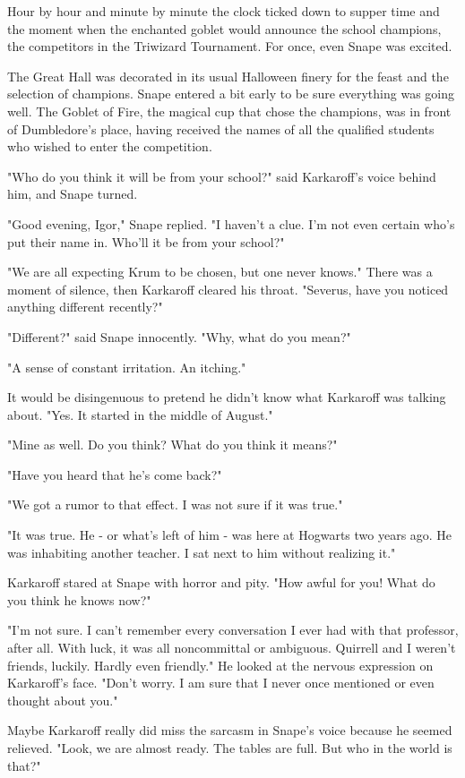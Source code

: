 Hour by hour and minute by minute the clock ticked down to supper time and the moment when the enchanted goblet would announce the school champions, the competitors in the Triwizard Tournament. For once, even Snape was excited.

The Great Hall was decorated in its usual Halloween finery for the feast and the selection of champions. Snape entered a bit early to be sure everything was going well. The Goblet of Fire, the magical cup that chose the champions, was in front of Dumbledore's place, having received the names of all the qualified students who wished to enter the competition.

"Who do you think it will be from your school?" said Karkaroff's voice behind him, and Snape turned.

"Good evening, Igor," Snape replied. "I haven't a clue. I'm not even certain who's put their name in. Who'll it be from your school?"

"We are all expecting Krum to be chosen, but one never knows." There was a moment of silence, then Karkaroff cleared his throat. "Severus, have you noticed anything{\el} different{\el} recently?"

"Different?" said Snape innocently. "Why, what do you mean?"

"A sense of{\el} constant irritation. An itching."

It would be disingenuous to pretend he didn't know what Karkaroff was talking about. "Yes. It started in the middle of August."

"Mine as well. Do you think{\el}? What do you think it means?"

"Have you heard that he's come back?"

"We got a rumor to that effect. I was not sure if it was true."

"It was true. He - or what's left of him - was here at Hogwarts two years ago. He was inhabiting another teacher. I sat next to him without realizing it."

Karkaroff stared at Snape with horror and pity. "How awful for you! What do you think he knows now?"

"I'm not sure. I can't remember every conversation I ever had with that professor, after all. With luck, it was all noncommittal or ambiguous. Quirrell and I weren't friends, luckily. Hardly even friendly." He looked at the nervous expression on Karkaroff's face. "Don't worry. I am sure that I never once mentioned or even thought about you."

Maybe Karkaroff really did miss the sarcasm in Snape's voice because he seemed relieved. "Look, we are almost ready. The tables are full. But who in the world is that?"

